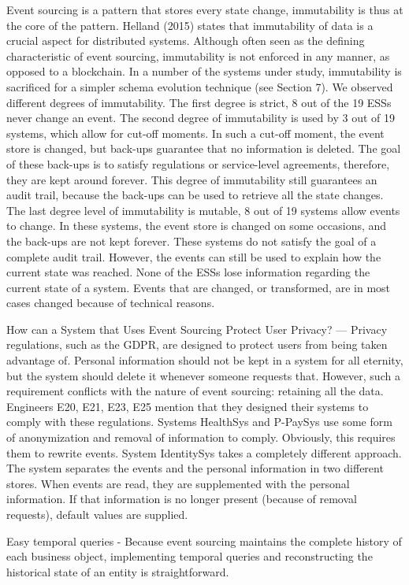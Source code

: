 Event sourcing is a pattern that stores every state change, immutability is thus at the core of the pattern. Helland (2015) states that immutability of data is a crucial aspect for distributed systems. Although often seen as the defining characteristic of event sourcing, immutability is not enforced in any manner, as opposed to a blockchain. In a number of the systems under study, immutability is sacrificed for a simpler schema evolution technique (see Section 7). We observed different degrees of immutability. The first degree is strict, 8 out of the 19 ESSs never change an event. The second degree of immutability is used by 3 out of 19 systems, which allow for cut-off moments. In such a cut-off moment, the event store is changed, but back-ups guarantee that no information is deleted. The goal of these back-ups is to satisfy regulations or service-level agreements, therefore, they are kept around forever. This degree of immutability still guarantees an audit trail, because the back-ups can be used to retrieve all the state changes. The last degree level of immutability is mutable, 8 out of 19 systems allow events to change. In these systems, the event store is changed on some occasions, and the back-ups are not kept forever. These systems do not satisfy the goal of a complete audit trail. However, the events can still be used to explain how the current state was reached. None of the ESSs lose information regarding the current state of a system. Events that are changed, or transformed, are in most cases changed because of technical reasons.

How can a System that Uses Event Sourcing Protect User Privacy? — Privacy regulations, such as the GDPR, are designed to protect users from being taken advantage of. Personal information should not be kept in a system for all eternity, but the system should delete it whenever someone requests that. However, such a requirement conflicts with the nature of event sourcing: retaining all the data. Engineers E20, E21, E23, E25 mention that they designed their systems to comply with these regulations. Systems HealthSys and P-PaySys use some form of anonymization and removal of information to comply. Obviously, this requires them to rewrite events. System IdentitySys takes a completely different approach. The system separates the events and the personal information in two different stores. When events are read, they are supplemented with the personal information. If that information is no longer present (because of removal requests), default values are supplied.

Easy temporal queries - Because event sourcing maintains the complete history of each business object, implementing temporal queries and reconstructing the historical state of an entity is straightforward. %




